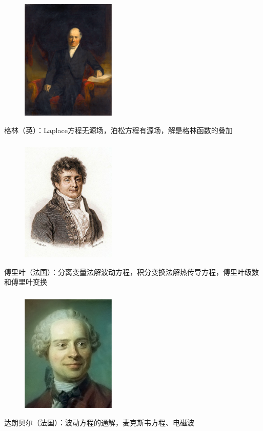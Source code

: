 \begin{frame}
	\frametitle{}
	\begin{center}
		\begin{figure}
			\includegraphics[width=4.5cm]{figs/fig1-3-2.png}	
		\end{figure}
	\end{center}
		{格林（英）：Laplace方程无源场，泊松方程有源场，解是格林函数的叠加}
\end{frame}

\begin{frame}
	\frametitle{}
	\begin{center}
		\begin{figure}
			\includegraphics[width=4.5cm]{figs/fig1-3-3.png}	
		\end{figure}
	\end{center}
	{傅里叶（法国）：分离变量法解波动方程，积分变换法解热传导方程，傅里叶级数和傅里叶变换}
\end{frame}

\begin{frame}
	\frametitle{}
	\begin{center}
		\begin{figure}
			\includegraphics[width=4.5cm]{figs/fig1-3-7.png}	
		\end{figure}
	\end{center}
	{达朗贝尔（法国）：波动方程的通解，麦克斯韦方程、电磁波}
\end{frame}

